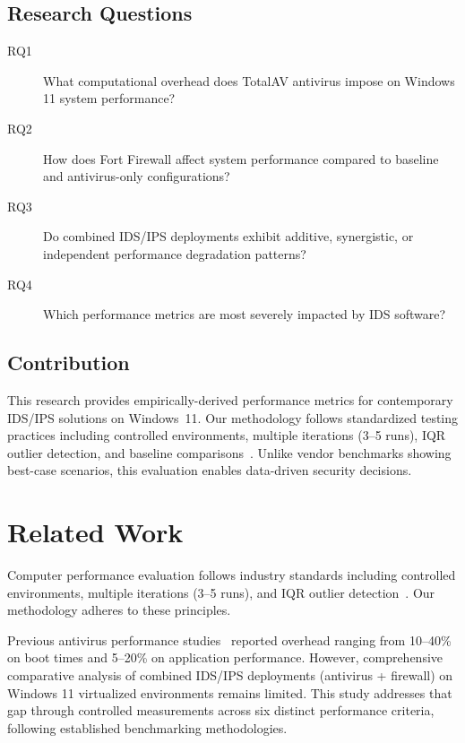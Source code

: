 \documentclass[runningheads,a4paper,english]{llncs}[2022/01/12]
\begin{document}
\subsection{Research Questions}

\begin{description}
\item[RQ1] What computational overhead does TotalAV antivirus impose on Windows 11 system performance?
\item[RQ2] How does Fort Firewall affect system performance compared to baseline and antivirus-only configurations?
\item[RQ3] Do combined IDS/IPS deployments exhibit additive, synergistic, or independent performance degradation patterns?
\item[RQ4] Which performance metrics are most severely impacted by IDS software?
\end{description}

\subsection{Contribution}

This research provides empirically-derived performance metrics for contemporary IDS/IPS solutions on Windows~11.
Our methodology follows standardized testing practices including controlled environments, multiple iterations (3--5 runs), IQR outlier detection, and baseline comparisons~\cite{tomshardware-methodology,tomshardware-testing-guide,anandtech-benchmarks,anandtech-statistical-methods}.
Unlike vendor benchmarks showing best-case scenarios, this evaluation enables data-driven security decisions.

\section{Related Work}
\label{sec:related}

Computer performance evaluation follows industry standards including controlled environments, multiple iterations (3--5 runs), and IQR outlier detection~\cite{tomshardware-methodology,tomshardware-testing-guide,anandtech-benchmarks,anandtech-statistical-methods}.
Our methodology adheres to these principles.

Previous antivirus performance studies~\cite{tomshardware-antivirus} reported overhead ranging from 10--40\% on boot times and 5--20\% on application performance. However, comprehensive comparative analysis of combined IDS/IPS deployments (antivirus + firewall) on Windows 11 virtualized environments remains limited. This study addresses that gap through controlled measurements across six distinct performance criteria, following established benchmarking methodologies.
\end{document}
